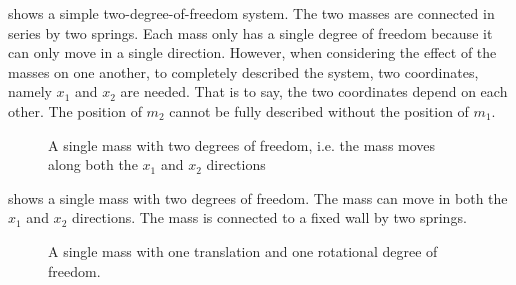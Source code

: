    shows a simple two-degree-of-freedom system. The two masses are connected in series by two springs. Each mass only has a single degree of freedom because it can only move in a single direction. However, when considering the effect of the masses on one another, to completely described the system, two coordinates, namely $x_{1}$ and $x_{2}$ are needed. That is to say, the two coordinates depend on each other. The position of $m_2$ cannot be fully described without the position of $m_1$.

  \begin{figure}
    \centering
    \caption{A single mass with two degrees of freedom, i.e. the mass moves along both the $x_1$ and $x_2$ directions}\label{fig:single_mass_with_two_degrees_of_freedom}
  \end{figure}

   shows a single mass with two degrees of freedom. The mass can move in both the $x_1$ and $x_2$ directions. The mass is connected to a fixed wall by two springs.

  \begin{figure}
    \centering
    \caption{A single mass with one translation and one rotational degree of freedom.}\label{fig:single_mass_with_one_translation_and_one_rotational_degree_of_freedom}
  \end{figure}

